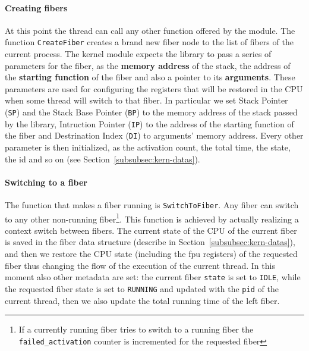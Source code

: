 \documentclass[a4paper,10pt]{article}
\begin{document}
  \paragraph{Creating fibers}
    At this point the thread can call any other function offered by the module. The function \lstinline{CreateFiber} creates a brand new fiber node to the list of fibers of the current process. The kernel module expects the library to pass a series of parameters for the fiber, as the \textbf{memory address} of the stack, the address of the \textbf{starting function} of the fiber and also a pointer to its \textbf{arguments}. These parameters are used for configuring the registers that will be restored in the CPU when some thread will switch to that fiber. In particular we set Stack Pointer (\texttt{SP}) and the Stack Base Pointer (\texttt{BP}) to the memory address of the stack passed by the library, Intruction Pointer (\texttt{IP}) to the address of the starting function of the fiber and Destrination Index (\texttt{DI}) to arguments’ memory address. Every other parameter is then initialized, as the activation count, the total time, the state, the id and so on (see Section~\ref{subsubsec:kern-datas}).

  \paragraph{Switching to a fiber}
    The function that makes a fiber running is \lstinline{SwitchToFiber}. Any fiber can switch to any other non-running fiber\footnote{If a currently running fiber tries to switch to a running fiber the \lstinline{failed_activation} counter is incremented for the requested fiber}. This function is achieved by actually realizing a context switch between fibers. The current state of the CPU of the current fiber is saved in the fiber data structure (describe in Section~\ref{subsubsec:kern-datas}), and then we restore the CPU state (including the fpu registers) of the requested fiber thus changing the flow of the execution of the current thread. In this moment also other metadata are set: the current fiber \lstinline{state} is set to \texttt{IDLE}, while the requested fiber state is set to \texttt{RUNNING} and updated with the \texttt{pid} of the current thread, then we also update the total running time of the left fiber.
\end{document}
